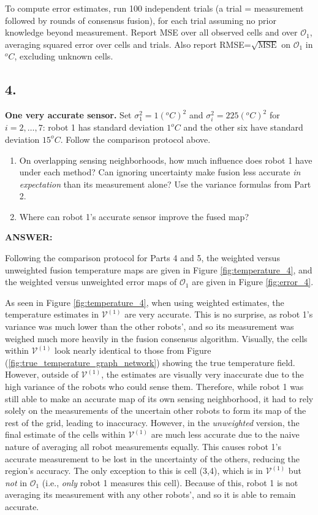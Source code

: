 \documentclass[12pt]{article}
\begin{document}
To compute error estimates, run 100 independent trials (a trial = measurement followed by rounds of consensus fusion), for each trial assuming no prior knowledge beyond measurement. Report MSE over all observed cells and over $\mathcal O_1$, averaging squared error over cells and trials. Also report RMSE=$\sqrt{\text{MSE}}$ on $\mathcal O_1$ in $^oC$, excluding unknown cells.

\subsection*{4.}
\textbf{One very accurate sensor.}
Set $\sigma_1^2=1(^oC)^2$ and $\sigma_i^2=225(^oC)^2$ for $i=2,\dots,7$: robot 1 has standard deviation $1^oC$ and the other six have standard deviation $15^oC$. Follow the comparison protocol above.
\begin{enumerate}[label=(\alph*)]
    \item On overlapping sensing neighborhoods, how much influence does robot 1 have under each method? Can ignoring uncertainty make fusion less accurate \textit{in expectation} than its measurement alone? Use the variance formulas from Part 2.
    \item Where can robot 1's accurate sensor improve the fused map?
\end{enumerate}

\noindent\textbf{ANSWER:}

Following the comparison protocol for Parts 4 and 5, the weighted versus unweighted fusion temperature maps are given in Figure \ref{fig:temperature_4}, and the weighted versus unweighted error maps of $\mathcal O_1$ are given in Figure \ref{fig:error_4}. 

As seen in Figure \ref{fig:temperature_4}, when using weighted estimates, the temperature estimates in $\mathcal V^{(1)}$ are very accurate. This is no surprise, as robot 1's variance was much lower than the other robots', and so its measurement was weighed much more heavily in the fusion consensus algorithm. Visually, the cells within $\mathcal V^{(1)}$ look nearly identical to those from Figure (\ref{fig:true_temperature_graph_network}) showing the true temperature field. However, outside of $\mathcal V^{(1)}$, the estimates are visually very inaccurate due to the high variance of the robots who could sense them. Therefore, while robot 1 was still able to make an accurate map of its own sensing neighborhood, it had to rely solely on the measurements of the uncertain other robots to form its map of the rest of the grid, leading to inaccuracy. However, in the \textit{unweighted} version, the final estimate of the cells within $\mathcal V^{(1)}$ are much less accurate due to the naive nature of averaging all robot measurements equally. This causes robot 1's accurate measurement to be lost in the uncertainty of the others, reducing the region's accuracy. The only exception to this is cell (3,4), which is in $\mathcal V^{(1)}$ but \textit{not} in $\mathcal O_1$ (i.e., \textit{only} robot 1 measures this cell). Because of this, robot 1 is not averaging its measurement with any other robots', and so it is able to remain accurate.
\end{document}
